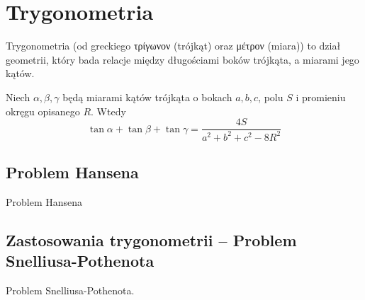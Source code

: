 %

\section{Trygonometria}

Trygonometria (od greckiego τρίγωνον (trójkąt) oraz μέτρον (miara)) to dział geometrii, który bada relacje między długościami boków trójkąta, a miarami jego kątów.



\begin{proposition}
	Niech $\alpha, \beta, \gamma$ będą miarami kątów trójkąta o bokach $a, b, c$, polu $S$ i promieniu okręgu opisanego $R$.
	Wtedy
	\begin{equation}
		\tan \alpha + \tan \beta + \tan \gamma = \frac{4S}{a^2 + b^2 + c^2 - 8R^2}
	\end{equation}
\end{proposition}

\begin{theorem}
\end{theorem}









\subsection{Problem Hansena}
Problem Hansena
%

\subsection{Zastosowania trygonometrii -- Problem Snelliusa-Pothenota}
Problem Snelliusa-Pothenota.
%


%